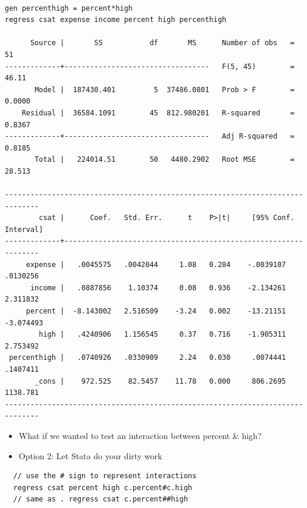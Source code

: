 \documentclass[]{book}
\providecommand{\tightlist}{%
  \setlength{\itemsep}{0pt}\setlength{\parskip}{0pt}}
\begin{document}
\begin{verbatim}

gen percenthigh = percent*high
regress csat expense income percent high percenthigh

      Source |       SS           df       MS      Number of obs   =        51
-------------+----------------------------------   F(5, 45)        =     46.11
       Model |  187430.401         5  37486.0801   Prob > F        =    0.0000
    Residual |  36584.1091        45  812.980201   R-squared       =    0.8367
-------------+----------------------------------   Adj R-squared   =    0.8185
       Total |   224014.51        50   4480.2902   Root MSE        =    28.513

------------------------------------------------------------------------------
        csat |      Coef.   Std. Err.      t    P>|t|     [95% Conf. Interval]
-------------+----------------------------------------------------------------
     expense |   .0045575   .0042044     1.08   0.284    -.0039107    .0130256
      income |   .0887856    1.10374     0.08   0.936    -2.134261    2.311832
     percent |  -8.143002   2.516509    -3.24   0.002    -13.21151   -3.074493
        high |   .4240906   1.156545     0.37   0.716    -1.905311    2.753492
 percenthigh |   .0740926   .0330909     2.24   0.030     .0074441    .1407411
       _cons |    972.525    82.5457    11.78   0.000     806.2695    1138.781
------------------------------------------------------------------------------
\end{verbatim}

\begin{itemize}
\tightlist
\item
  What if we wanted to test an interaction between percent \& high?
\item
  Option 2: Let Stata do your dirty work
\end{itemize}

\begin{verbatim}
  // use the # sign to represent interactions 
  regress csat percent high c.percent#c.high
  // same as . regress csat c.percent##high
\end{verbatim}
\end{document}
